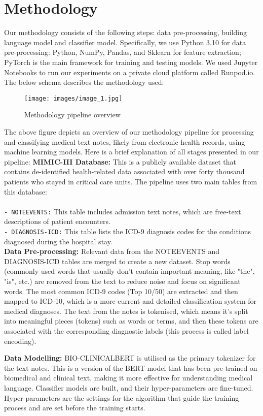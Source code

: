 \documentclass[journal,article,submit,pdftex,moreauthors]{Definitions/mdpi}
\begin{document}
\section{Methodology}\label{sec2}
Our methodology consists of the following steps: data pre-processing, building language model and classifier model. Specifically, we use Python 3.10 for data pre-processing: Python, NumPy, Pandas, and Sklearn for feature extraction; PyTorch is the main framework for training and testing models. We used Jupyter Notebooks to run our experiments on a private cloud platform called Runpod.io. The below schema describes the methodology used: 
\begin{figure}[H]
\centering
\texttt{[image: images/image\_1.jpg]}
\caption{\label{fig5}Methodology pipeline overview}
\end{figure}
The above figure depicts an overview of our methodology pipeline for processing and classifying medical text notes, likely from electronic health records, using machine learning models. Here is a brief explanation of all stages presented in our pipeline:
\textbf{MIMIC-III Database:} This is a publicly available dataset that contains de-identified health-related data associated with over forty thousand patients who stayed in critical care units. The pipeline uses two main tables from this database: \\ \\
\Item \texttt{- NOTEEVENTS:}
This table includes admission text notes, which are free-text descriptions of patient encounters. \\
\Item \texttt{- DIAGNOSIS-ICD:} 
This table lists the ICD-9 diagnosis codes for the conditions diagnosed during the hospital stay. \\

\textbf{Data Pre-processing:}
Relevant data from the NOTEEVENTS and DIAGNOSIS-ICD tables are merged to create a new dataset.
Stop words (commonly used words that usually don't contain important meaning, like "the", "is", etc.) are removed from the text to reduce noise and focus on significant words.
The most common ICD-9 codes (Top 10/50) are extracted and then mapped to ICD-10, which is a more current and detailed classification system for medical diagnoses.
The text from the notes is tokenised, which means it's split into meaningful pieces (tokens) such as words or terms, and then these tokens are associated with the corresponding diagnostic labels (this process is called label encoding).

\textbf{Data Modelling:}
BIO-CLINICALBERT is utilised as the primary tokenizer for the text notes. This is a version of the BERT model that has been pre-trained on biomedical and clinical text, making it more effective for understanding medical language.
Classifier models are built, and their hyper-parameters are fine-tuned. Hyper-parameters are the settings for the algorithm that guide the training process and are set before the training starts.
\end{document}
